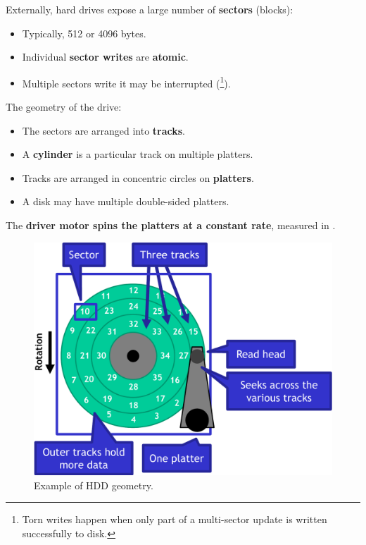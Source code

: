 \noindent
Externally, hard drives expose a large number of \textbf{sectors} (blocks):
\begin{itemize}
    \item Typically, 512 or 4096 bytes.
    \item Individual \textbf{sector writes} are \textbf{atomic}.
    \item Multiple sectors write it may be interrupted (\footnote{Torn writes happen when only part of a multi-sector update is written successfully to disk.}).
\end{itemize}
The geometry of the drive:
\begin{itemize}
    \item The sectors are arranged into \textbf{tracks}.
    \item A \textbf{cylinder} is a particular track on multiple platters.
    \item Tracks are arranged in concentric circles on \textbf{platters}.
    \item A disk may have multiple double-sided platters.
\end{itemize}
The \textbf{driver motor spins the platters at a constant rate}, measured in .

\newpage

\begin{figure}[!htp]
    \centering
    \includegraphics[width=.8\textwidth]{img/files-7.pdf}
    \caption{Example of HDD geometry.}
    \label{fig: example of hdd geometry}
\end{figure}

